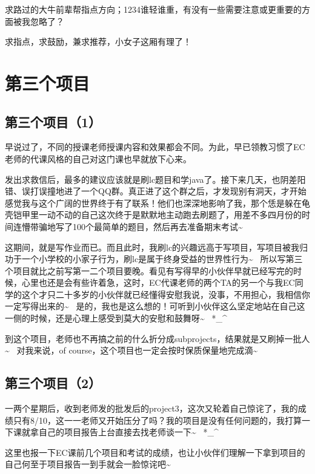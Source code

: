 \documentclass[12pt]{book}
\begin{document}
求路过的大牛前辈帮指点方向；1234谁轻谁重，有没有一些需要注意或更重要的方面被我忽略了？

求指点，求鼓励，兼求推荐，小女子这厢有理了！

\chapter{第三个项目}
\label{sec-32}
\section{第三个项目（1）}
\label{sec-32-1}

早说过了，不同的授课老师授课内容和效果都会不同。为此，早已领教习惯了EC老师的代课风格的自己对这门课也早就放下心来。

发出求救信后，最多的建议应该就是刷lc题目和学java了。接下来几天，也阴差阳错、误打误撞地进了一个QQ群。真正进了这个群之后，才发现别有洞天，才开始感觉我与这个广阔的世界终于有了联系！他们也深深地影响了我，那个恁是躲在龟壳铠甲里一动不动的自己这次终于是默默地主动跑去刷题了，用差不多四月份的时间连懵带骗地写了100个最简单的题目，然后再去准备期末考试\textasciitilde{}~　

这期间，就是写作业而已。而且此时，我刷lc的兴趣远高于写项目，写项目被我归功于一个小学校的小家子行为，刷lc是属于终身受益的世界性行为\textasciitilde{}~ 所以写第三个项目就比之前写第一二个项目要晚。看见有写得早的小伙伴早就已经写完的时候，心里也还是会有些许着急，这时，EC代课老师的两个TA的另一个与我EC同学的这个才只二十多岁的小伙伴就已经懂得安慰我说，没事，不用担心，我相信你一定写得出来的\textasciitilde{}~ 是的，我也是这么想的！可听到小伙伴这么坚定地站在自己这一侧的时候，还是心理上感受到莫大的安慰和鼓舞呀\textasciitilde{}~ *\_\^{}

到这个项目，老师也不再搞之前的什么折分成subprojects，结果就是又刷掉一批人\textasciitilde{}~ 对我来说，of course，这个项目也一定会按时保质保量地完成滴\textasciitilde{}~

\section{第三个项目（2）}
\label{sec-32-2}

一两个星期后，收到老师发的批发后的project3，这次又轮着自己惊诧了，我的成绩只有8/10，这一一老师又开始压分了吗？我的项目是没有任何问题的，我打算一下课就拿自己的项目报告上台直接去找老师谈一下\textasciitilde{}~ *\_\^{}

这里也报一下EC课前几个项目和考试的成绩，也让小伙伴们理解一下拿到项目的自己何至于项目报告一到手就会一脸惊诧吧\textasciitilde{}~
\end{document}
